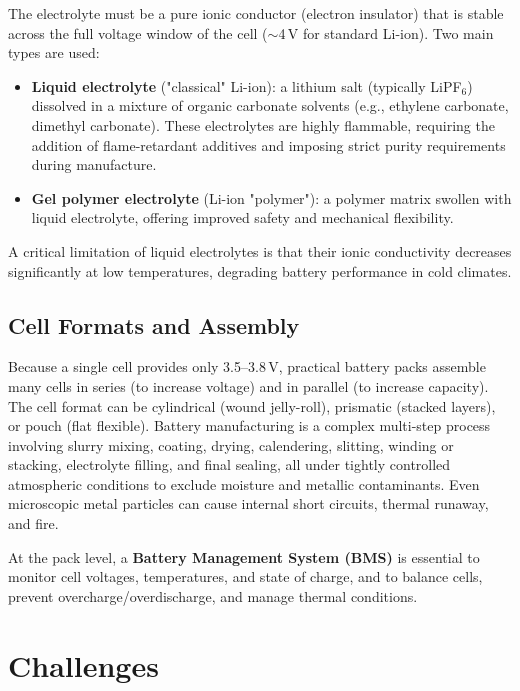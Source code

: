 The electrolyte must be a pure ionic conductor (electron insulator) that is stable across the full voltage window of the cell ($\sim$4\,V for standard Li-ion). Two main types are used:

\begin{itemize}
    \item \textbf{Liquid electrolyte} ("classical" Li-ion): a lithium salt (typically LiPF$_6$) dissolved in a mixture of organic carbonate solvents (e.g., ethylene carbonate, dimethyl carbonate). These electrolytes are highly flammable, requiring the addition of flame-retardant additives and imposing strict purity requirements during manufacture.
    \item \textbf{Gel polymer electrolyte} (Li-ion "polymer"): a polymer matrix swollen with liquid electrolyte, offering improved safety and mechanical flexibility.
\end{itemize}

A critical limitation of liquid electrolytes is that their ionic conductivity decreases significantly at low temperatures, degrading battery performance in cold climates.

\subsection{Cell Formats and Assembly}

Because a single cell provides only 3.5--3.8\,V, practical battery packs assemble many cells in series (to increase voltage) and in parallel (to increase capacity). The cell format can be cylindrical (wound jelly-roll), prismatic (stacked layers), or pouch (flat flexible). Battery manufacturing is a complex multi-step process involving slurry mixing, coating, drying, calendering, slitting, winding or stacking, electrolyte filling, and final sealing, all under tightly controlled atmospheric conditions to exclude moisture and metallic contaminants. Even microscopic metal particles can cause internal short circuits, thermal runaway, and fire.

At the pack level, a \textbf{Battery Management System (BMS)} is essential to monitor cell voltages, temperatures, and state of charge, and to balance cells, prevent overcharge/overdischarge, and manage thermal conditions.

\section{Challenges}

